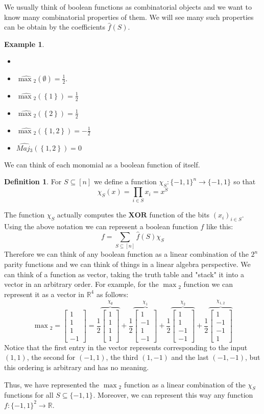 \documentclass[a4paper,titlepage,twocolumn]{book}
\theoremstyle{definition}
\newtheorem{example}{Example}[section]
\newtheorem{definition}{Definition}[section]
\newcommand{\bftext}[1]{\ensuremath{\mathbf{#1}}}
\newcommand{\Xor}{\bftext{XOR}}
\newcommand{\half}{\ensuremath{\frac{1}{2}}}
\newcommand{\fhat}{\ensuremath{\widehat{f}}}
\newcommand{\fhatparam}[1]{\ensuremath{\fhat\left(#1\right)}}
\newcommand{\set}[1]{\ensuremath{\left\{#1\right\}}}
\newcommand{\chis}{\ensuremath{\chi_S}}
\newcommand{\chisparam}[1]{\ensuremath{\chi_S\left(#1\right)}}
\newcommand{\func}[3]{\ensuremath{#1:#2\rightarrow #3}}
\newcommand{\MO}[1][]{\ensuremath{\{-1,1\}^{#1}}}
\newcommand{\sqbkt}[1][n]{\ensuremath{\left[#1\right]}}
\newcommand{\fourvec}[4]{\ensuremath{\begin{bmatrix}
			#1 \\
			#2 \\
			#3 \\
			#4 
\end{bmatrix}}}
\newcommand{\pair}[2]{\ensuremath{\left(#1,#2\right)}}
\newcommand{\Reals}{\ensuremath{\mathbb{R}}}
\begin{document}
	We usually think of boolean functions as combinatorial objects and we want to know many combinatorial properties of them. We will see many such properties can be obtain by the coefficients \fhatparam{S}.
\begin{example}
	\begin{itemize}
		\item[]
		\item $\widehat{\max{}_2}\left(\emptyset\right) = \half$.
		\item $\widehat{\max{}_2}\left(\set{1}\right) = \half $
		\item $\widehat{\max{}_2}\left(\set{2}\right) = \half $
		\item $\widehat{\max{}_2}\left(\set{1,2}\right) = -\half $
		\item $\widehat{Maj{}_3}\left(\set{1,2}\right) = 0 $
	\end{itemize} 
\end{example}

We can think of each monomial as a boolean function of itself.
\begin{definition}
	For $S\subseteq\sqbkt$ we define a function \func{\chis}{\MO[n]}{\MO} so that \[\chisparam{x} = \prod_{i\in S}{x_i} = x^S\]
\end{definition}
The function \chis{} actually computes the \Xor{} function of the bits $\left(x_i\right)_{i\in S}$.
	Using the above notation we can represent a boolean function $f$ like this:
	\[f=\sum_{S\subseteq\sqbkt}{\fhatparam{S}\chis}\]
	Therefore we can think of any boolean function as a linear combination of the $2^n$ parity functions and we can think of things in a linear algebra perspective. We can think of a function as vector, taking the truth table and "stack" it into a vector in an arbitrary order. For example, for the $\max{}_2$ function we can represent it as a vector in $\Reals^4$ as follows:
	\[
	\max{}_2 = \fourvec{1}{1}{1}{-1} = \half\overbrace{\fourvec{1}{1}{1}{1}}^{\chi_\emptyset} + \half\overbrace{\fourvec{1}{-1}{1}{-1}}^{\chi_{1}} +
	\half\overbrace{\fourvec{1}{1}{-1}{-1}}^{\chi_{2}} +
	\half\overbrace{\fourvec{1}{-1}{-1}{1}}^{\chi_{1,2}} 
	\]
	Notice that the first entry in the vector represents corresponding to the  input \pair{1}{1}, the second for \pair{-1}{1}, the third \pair{1}{-1} and the last \pair{-1}{-1}, but this ordering is arbitrary and has no meaning.
	
	Thus, we have represented the $\max{}_2$  function as a linear combination of the $\chi_S$ functions for all $S \subseteq \MO$. Moreover, we can represent this way any function \func{f}{\MO[2]}{\Reals}.
\end{document}
